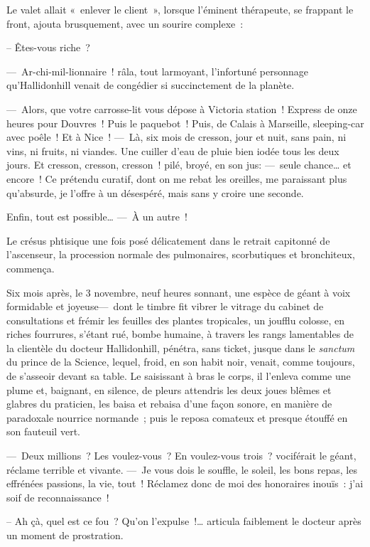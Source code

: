 \documentclass[french,twoside]{book} %
\begin{document}
Le valet allait « enlever le client », lorsque l’éminent thérapeute, se frappant le front, ajouta brusquement, avec un sourire complexe :\par
   – Êtes-vous riche ?\par
— Ar-chi-mil-lionnaire ! râla, tout larmoyant, l’infortuné personnage qu’Hallidonhill venait de congédier si succinctement de la planète.\par
— Alors, que votre carrosse-lit vous dépose à Victoria station ! Express de onze heures pour Douvres ! Puis le paquebot ! Puis, de Calais à Marseille, sleeping-car avec poêle ! Et à Nice ! — Là, six mois de cresson, jour et nuit, sans pain, ni vins, ni fruits, ni viandes. Une cuiller d’eau de pluie bien iodée tous les deux jours. Et cresson, cresson, cresson ! pilé, broyé, en son jus: — seule chance… et encore ! Ce prétendu curatif, dont on me rebat les oreilles, me paraissant plus qu’absurde, je l’offre à un désespéré, mais sans y croire une seconde.\par
Enfin, tout est possible… — À un autre !\par
Le crésus phtisique une fois posé délicatement dans le retrait capitonné de l’ascenseur, la procession normale des pulmonaires, scorbutiques et bronchiteux, commença.\par
Six mois après, le 3 novembre, neuf heures   sonnant, une espèce de géant à voix formidable et joyeuse— dont le timbre fit vibrer le vitrage du cabinet de consultations et frémir les feuilles des plantes tropicales, un joufflu colosse, en riches fourrures, s’étant rué, bombe humaine, à travers les rangs lamentables de la clientèle du docteur Hallidonhill, pénétra, sans ticket, jusque dans le \emph{sanctum} du prince de la Science, lequel, froid, en son habit noir, venait, comme toujours, de s’asseoir devant sa table. Le saisissant à bras le corps, il l’enleva comme une plume et, baignant, en silence, de pleurs attendris les deux joues blêmes et glabres du praticien, les baisa et rebaisa d’une façon sonore, en manière de paradoxale nourrice normande ; puis le reposa comateux et presque étouffé en son fauteuil vert.\par
— Deux millions ? Les voulez-vous ? En voulez-vous trois ? vociférait le géant, réclame terrible et vivante. — Je vous dois le souffle, le soleil, les bons repas, les effrénées passions, la vie, tout ! Réclamez donc de moi des honoraires inouïs : j’ai soif de reconnaissance !\par
   – Ah çà, quel est ce fou ? Qu’on l’expulse !… articula faiblement le docteur après un moment de prostration.\par
\end{document}
